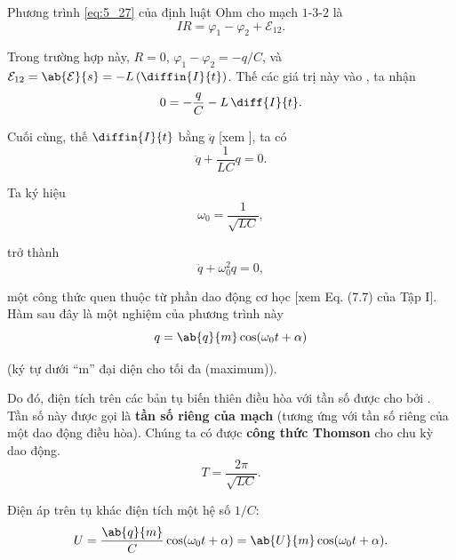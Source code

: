 \noindent
Phương trình \eqref{eq:5_27} của định luật Ohm cho mạch $1$-$3$-$2$ là
\begin{equation*}
    IR = \varphi_1 - \varphi_2 + \mathcal{E}_{12}.
\end{equation*}

\noindent
Trong trường hợp này, $R=0$, $\varphi_1 - \varphi_2=-q/C$, và $\mathcal{E}_{12}=\ab{\mathcal{E}}{s} = -L\, (\diffin{I}{t})$.
Thế các giá trị này vào , ta nhận
\begin{equation}\label{eq:13_1}
    0 = - \frac{q}{C} - L\, \diff{I}{t}.
\end{equation}

\noindent
Cuối cùng, thế $\diffin{I}{t}$ bằng $\ddot{q}$ [xem ], ta có
\begin{equation}\label{eq:13_2}
    \ddot{q} + \frac{1}{LC} q = 0.
\end{equation}

Ta ký hiệu
\begin{equation}\label{eq:13_3}
    \omega_0 = \frac{1}{\sqrt{LC}},
\end{equation}

\noindent
{} trở thành
\begin{equation}\label{eq:13_4}
    \ddot{q} + \omega_0^2 q = 0,
\end{equation}

\noindent
một công thức quen thuộc từ phần dao động cơ học [xem Eq. (7.7) của Tập I].
Hàm sau đây là một nghiệm của phương trình này
\begin{equation}\label{eq:13_5}
    q = \ab{q}{m} \cos(\omega_0 t + \alpha)
\end{equation}

\noindent
(ký tự dưới ``m'' đại diện cho tối đa (maximum)).

Do đó, điện tích trên các bản tụ biến thiên điều hòa với tần số được cho bởi .
Tần số này được gọi là \textbf{tần số riêng của mạch} (tương ứng với tần số riêng của một dao động điều hòa).
Chúng ta có được \textbf{công thức Thomson} cho chu kỳ dao động.
\begin{equation}\label{eq:13_6}
    T = \frac{2\pi}{\sqrt{LC}}.
\end{equation}

Điện áp trên tụ khác điện tích một hệ số $1/C$:
\begin{equation}\label{eq:13_7}
    U = \frac{\ab{q}{m}}{C} \cos(\omega_0 t + \alpha) = \ab{U}{m} \cos(\omega_0 t + \alpha).
\end{equation}

